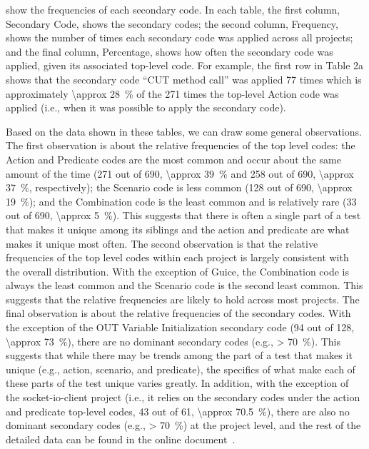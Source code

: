  show the frequencies of each secondary code.
%
In each table, the first column, Secondary Code, shows the secondary codes; the second column, Frequency, shows the number of times each secondary code was applied across all projects; and the final column, Percentage, shows how often the secondary code was applied, given its associated top-level code.
%
For example, the first row in Table 2a shows that the secondary code \enquote{CUT method call} was applied \num{77} times which is approximately \SI{\approx 28}{\percent} of the \num{271} times the top-level Action code was applied (i.e., when it was possible to apply the secondary code).

Based on the data shown in these tables, we can draw some general observations.
%
The first observation is about the relative frequencies of the top level codes: the Action and Predicate codes are the most common and occur about the same amount of the time (\num{271} out of \num{690}, \SI{\approx 39}{\percent} and \num{258} out of \num{690}, \SI{\approx 37}{\percent}, respectively); the Scenario code is less common (\num{128} out of \num{690}, \SI{\approx 19}{\percent}); and the Combination code is the least common and is relatively rare (\num{33} out of \num{690}, \SI{\approx 5}{\percent}).
%
This suggests that there is often a single part of a test that makes it unique among its siblings and the action and predicate are what makes it unique most often.
%
The second observation is that the relative frequencies of the top level codes within each project is largely consistent with the overall distribution.
%
With the exception of Guice, the Combination code is always the least common and the Scenario code is the second least common.
%
This suggests that the relative frequencies are likely to hold across most projects.
%
The final observation is about the relative frequencies of the secondary codes.  With the exception of the OUT Variable Initialization secondary code (\num{94} out of \num{128}, \SI{\approx 73}{\percent}), there are no dominant secondary codes (e.g., \SI{> 70}{\percent}).
%
This suggests that while there may be trends among the part of a test that makes it unique (e.g., action, scenario, and predicate), the specifics of what make each of these parts of the test unique varies greatly.
%
In addition, with the exception of the socket-io-client project (i.e., it relies on the secondary codes under the action and predicate top-level codes, 43 out of 61, \SI{\approx 70.5}{\percent}), there are also no dominant secondary codes (e.g., \SI{> 70}{\percent}) at the project level, and the rest of the detailed data can be found in the online document~\cite{emp-study}.


